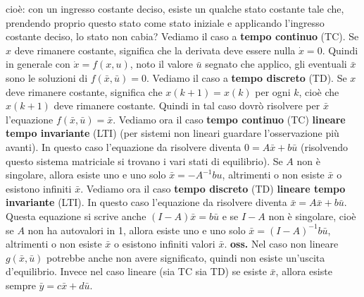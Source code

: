 cioè: con un ingresso costante deciso, esiste un qualche stato costante tale che, prendendo proprio questo stato come stato iniziale e applicando l'ingresso costante deciso, lo stato non cabia?\newline
\newline
Vediamo il caso a \textbf{tempo continuo} (TC). Se $x$ deve rimanere costante, significa che la derivata deve essere nulla $\dot{x} = 0$. Quindi in generale con $\dot{x} = f(x,u)$, noto il valore $\bar{u}$ segnato che applico, gli eventuali $\bar{x}$ sono le soluzioni di $f(\bar{x}, \bar{u}) = 0$.\newline
\newline
Vediamo il caso a \textbf{tempo discreto} (TD). Se $x$ deve rimanere costante, significa che $x(k+1) = x(k)$ per ogni $k$, cioè che $x(k+1)$ deve rimanere costante. Quindi in tal caso dovrò risolvere per $\bar{x}$ l'equazione $f(\bar{x}, \bar{u}) = \bar{x}$.\newline
\newline
Vediamo ora il caso \textbf{tempo continuo} (TC) \textbf{lineare tempo invariante} (LTI) (per sistemi non lineari guardare l'osservazione più avanti). In questo caso l'equazione da risolvere diventa $0 = A \bar{x} + b \bar{u}$ (risolvendo questo sistema matriciale si trovano i vari stati di equilibrio). Se $A$ non è singolare, allora esiste uno e uno solo $\bar{x} = -A^{-1} b u$, altrimenti o non esiste $\bar{x}$ o esistono infiniti $\bar{x}$.\newline
\newline
Vediamo ora il caso \textbf{tempo discreto} (TD) \textbf{lineare tempo invariante} (LTI). In questo caso l'equazione da risolvere diventa $\bar{x} = A \bar{x} + b \bar{u}$. Questa equazione si scrive anche $(I-A)\bar{x} = b \bar{u}$ e se $I-A$ non è singolare, cioè se $A$ non ha autovalori in 1, allora esiste uno e uno solo $\bar{x} = (I-A)^{-1} b \bar{u}$, altrimenti o non esiste $\bar{x}$ o esistono infiniti valori $\bar{x}$.\newline
\newline
\textbf{oss.} Nel caso non lineare $g(\bar{x}, \bar{u})$ potrebbe anche non avere significato, quindi non esiste un'uscita d'equilibrio. Invece nel caso lineare (sia TC sia TD) se esiste $\bar{x}$, allora esiste sempre $\bar{y} = c \bar{x} + d \bar{u}$.\newline
\newline
